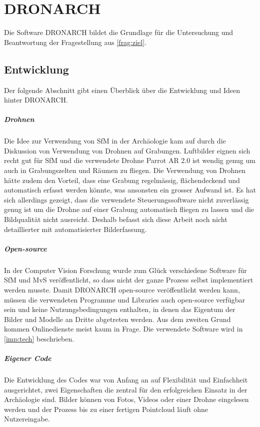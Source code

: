 \chapter{DRONARCH}
	Die Software DRONARCH bildet die Grundlage für die Untersuchung und Beantwortung der Fragestellung aus \autoref{frag:ziel}.
	\section{Entwicklung}
		Der folgende Abschnitt gibt einen Überblick über die Entwicklung und Ideen hinter DRONARCH. %
		
		\paragraph{Drohnen}
		Die Idee zur Verwendung von SfM in der Archäologie kam auf durch die Diskussion von Verwendung von Drohnen auf Grabungen. Luftbilder eignen sich recht gut für SfM \cite{ARP:ARP399, ARCM:ARCM667} und die verwendete Drohne Parrot AR 2.0 ist wendig genug um auch in Grabungszelten und Räumen zu fliegen. Die Verwendung von Drohnen hätte zudem den Vorteil, dass eine Grabung regelmässig, flächendeckend und automatisch erfasst werden könnte, was ansonsten ein grosser Aufwand ist.
		Es hat sich allerdings gezeigt, dass die verwendete Steuerungssoftware nicht zuverlässig genug ist um die Drohne auf einer Grabung automatisch fliegen zu lassen und die Bildqualität nicht ausreicht.
		Deshalb befasst sich diese Arbeit noch nicht detaillierter mit automatisierter Bilderfassung.
		
		\paragraph{Open-source}
		In der Computer Vision Forschung wurde zum Glück verschiedene Software für SfM und MvS veröffentlicht, so dass nicht der ganze Prozess selbst implementiert werden musste.
		Damit DRONARCH open-source veröffentlicht werden kann, müssen die verwendeten Programme und Libraries auch open-source verfügbar sein und keine Nutzungsbedingungen enthalten, in denen das Eigentum der Bilder und Modelle an Dritte abgetreten werden. Aus dem zweiten Grund kommen Onlinedienste meist kaum in Frage.
		Die verwendete Software wird in \autoref{imp:tech} beschrieben.
		
		\paragraph{Eigener Code}
		Die Entwicklung des Codes war von Anfang an auf Flexibilität und Einfachheit ausgerichtet, zwei Eigenschaften die zentral für den erfolgreichen Einsatz in der Archäologie sind.
		Bilder können von Fotos, Videos oder einer Drohne eingelesen werden und der Prozess bis zu einer fertigen Pointcloud läuft ohne Nutzereingabe.
		
